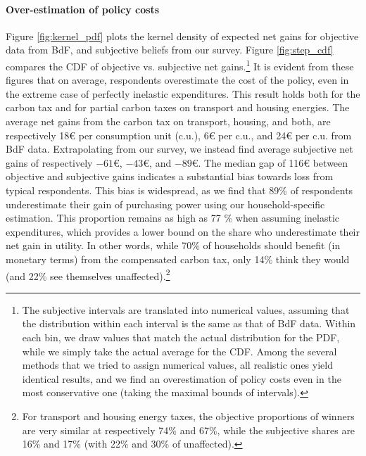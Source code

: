 \documentclass[12pt]{article} %
\begin{document}
\paragraph{Over-estimation of policy costs}
Figure \ref{fig:kernel_pdf} plots the kernel density of expected net gains for objective data from BdF, and subjective beliefs from our survey. Figure \ref{fig:step_cdf} compares the CDF of objective vs. subjective net gains.\footnote{The subjective intervals are translated into numerical values, assuming that the distribution within each interval is the same as that of BdF data. Within each bin, we draw values that match the actual distribution for the PDF, while we simply take the actual average for the CDF. Among the several methods that we tried to assign numerical values, all realistic ones yield identical results, and we find an overestimation of policy costs even in the most conservative one (taking the maximal bounds of intervals).} It is evident from these figures that on average, respondents overestimate the cost of the policy, even in the extreme case of perfectly inelastic expenditures. This result holds both for the carbon tax and for partial carbon taxes on transport and housing energies. The average net gains from the carbon tax on transport, housing, and both, are respectively 18\euro{} per consumption unit (c.u.), 6\euro{} per c.u., and 24\euro{} per c.u. from BdF data. Extrapolating from our survey, we instead find average subjective net gains of respectively $-61$\euro{}, $-43$\euro{}, and $-89$\euro{}. The median gap of 116\euro{} between objective and subjective gains indicates a substantial bias towards loss from typical respondents. This bias is widespread, as we find that 89\% of respondents underestimate their gain of purchasing power using our household-specific estimation. This proportion remains as high as 77 \% when assuming inelastic expenditures, which provides a lower bound on the share who underestimate their net gain in utility. In other words, while 70\% of households should benefit (in monetary terms) from the compensated carbon tax, only 14\% think they would (and 22\% see themselves unaffected).\footnote{For transport and housing energy taxes, the objective proportions of winners are very similar at respectively 74\% and 67\%, while the subjective shares are 16\% and 17\% (with 22\% and 30\% of unaffected).}

\end{document}
